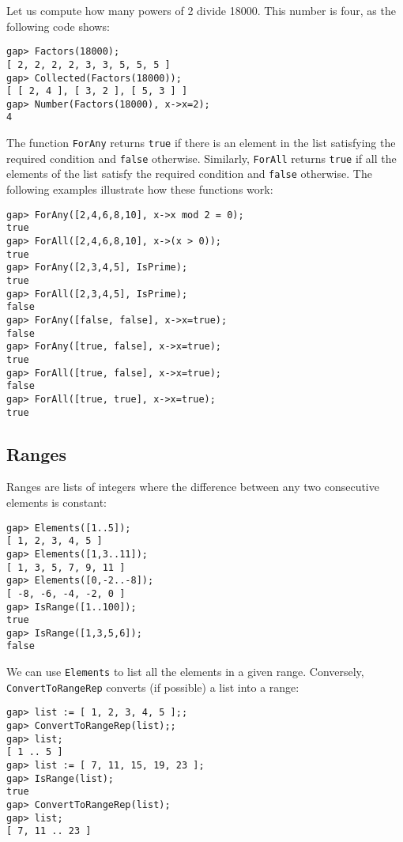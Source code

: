 \begin{example}
Let us compute how many powers of 2 divide 18000. This number is four, as
the following code shows:
\begin{lstlisting}
gap> Factors(18000);
[ 2, 2, 2, 2, 3, 3, 5, 5, 5 ]
gap> Collected(Factors(18000));
[ [ 2, 4 ], [ 3, 2 ], [ 5, 3 ] ]
gap> Number(Factors(18000), x->x=2);
4
\end{lstlisting}
\end{example}

The function \lstinline{ForAny} returns \lstinline{true} if there is an element in the list 
satisfying the required condition and 
\lstinline{false} otherwise. 
Similarly, 
\lstinline{ForAll} returns \lstinline{true} if all the
elements of the list satisfy the required condition and 
\lstinline{false} otherwise. The following examples
illustrate how these functions work: 
\begin{lstlisting}
gap> ForAny([2,4,6,8,10], x->x mod 2 = 0);
true
gap> ForAll([2,4,6,8,10], x->(x > 0));
true
gap> ForAny([2,3,4,5], IsPrime);
true
gap> ForAll([2,3,4,5], IsPrime);
false
gap> ForAny([false, false], x->x=true);
false
gap> ForAny([true, false], x->x=true);
true
gap> ForAll([true, false], x->x=true);
false
gap> ForAll([true, true], x->x=true);
true
\end{lstlisting}


\subsection{Ranges} 

Ranges are lists of integers where the difference between any two
consecutive elements is constant:
\begin{lstlisting}
gap> Elements([1..5]);
[ 1, 2, 3, 4, 5 ]
gap> Elements([1,3..11]);
[ 1, 3, 5, 7, 9, 11 ]
gap> Elements([0,-2..-8]);
[ -8, -6, -4, -2, 0 ]
gap> IsRange([1..100]);
true
gap> IsRange([1,3,5,6]);
false
\end{lstlisting}

We can use \lstinline{Elements} to list all the elements in a given range.
Conversely, \lstinline{ConvertToRangeRep} converts (if possible) a list into a
range:
\begin{lstlisting}
gap> list := [ 1, 2, 3, 4, 5 ];;
gap> ConvertToRangeRep(list);;
gap> list;
[ 1 .. 5 ]
gap> list := [ 7, 11, 15, 19, 23 ];
gap> IsRange(list);
true
gap> ConvertToRangeRep(list);
gap> list;
[ 7, 11 .. 23 ]
\end{lstlisting}


